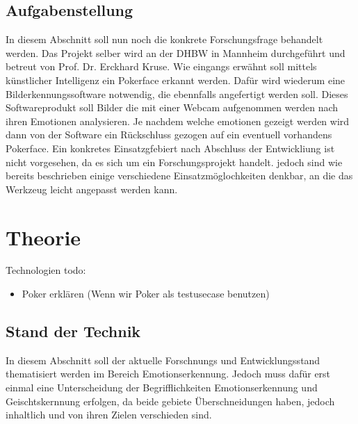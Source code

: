 \documentclass[12pt, a4paper]{scrbook}
\begin{document}
\section{Aufgabenstellung}
In diesem Abschnitt soll nun noch die konkrete Forschungsfrage behandelt werden. Das Projekt selber wird an der DHBW in Mannheim durchgeführt und betreut von Prof. Dr. Erckhard Kruse.
\newline
 Wie eingangs erwähnt soll mittels künstlicher Intelligenz ein Pokerface erkannt werden. Dafür wird wiederum eine Bilderkennungssoftware notwendig, die ebennfalls angefertigt werden soll. Dieses Softwareprodukt soll Bilder%
die mit einer Webcam aufgenommen werden nach ihren Emotionen analysieren. Je nachdem welche emotionen gezeigt werden wird dann von der Software ein Rückschluss gezogen auf ein eventuell vorhandens Pokerface. Ein konkretes Einsatzgfebiert nach Abschluss der Entwickliung ist nicht vorgesehen, da es sich um ein Forschungsprojekt handelt. jedoch sind wie bereits beschrieben einige verschiedene Einsatzmöglochkeiten denkbar, an die das Werkzeug leicht angepasst werden kann. 



\let\cleardoublepage\relax
\chapter{Theorie}
Technologien todo:
\begin{itemize}

\item Poker erklären (Wenn wir Poker als testusecase benutzen)
\end{itemize}

\section{Stand der Technik}
In diesem Abschnitt soll der aktuelle Forschnungs und Entwicklungsstand thematisiert werden im Bereich Emotionserkennung. Jedoch muss dafür erst einmal eine Unterscheidung der Begrifflichkeiten Emotionserkennung und Geischtskernnung erfolgen, da beide gebiete Überschneidungen haben, jedoch inhaltlich und von ihren Zielen verschieden sind.
\end{document}
